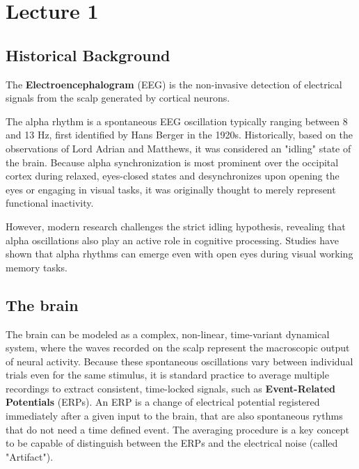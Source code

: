 
\section[Lecture 1 (25/02) -- {The Electroencephalogram}]{Lecture 1}

\subsection{Historical Background}

The \textbf{Electroencephalogram} (EEG) is the non-invasive detection of electrical signals from the scalp generated by cortical neurons.

The alpha rhythm is a spontaneous EEG oscillation typically ranging between 8 and 13 Hz, 
first identified by Hans Berger in the 1920s. Historically, based on the observations of Lord Adrian and Matthews,
it was considered an "idling" state of the brain. Because alpha synchronization is most prominent over the occipital 
cortex during relaxed, eyes-closed states and desynchronizes upon opening the eyes or engaging in visual tasks, 
it was originally thought to merely represent functional inactivity.

However, modern research challenges the strict idling hypothesis, 
revealing that alpha oscillations also play an active role in cognitive processing. 
Studies have shown that alpha rhythms can emerge even with open eyes during visual working memory tasks.

\subsection{The brain}

The brain can be modeled as a complex, non-linear, time-variant dynamical system, where the waves recorded on the scalp represent the macroscopic output of neural activity. 
Because these spontaneous oscillations vary between individual trials even for the same stimulus, it is standard practice to average multiple recordings to extract consistent, time-locked signals, such as \textbf{Event-Related Potentials} (ERPs).
An ERP is a change of electrical potential registered immediately after a given input to the brain, that are also spontaneous rythms that
do not need a time defined event. 
The averaging procedure is a key concept to be capable of distinguish between the ERPs and the electrical noise (called "Artifact").


